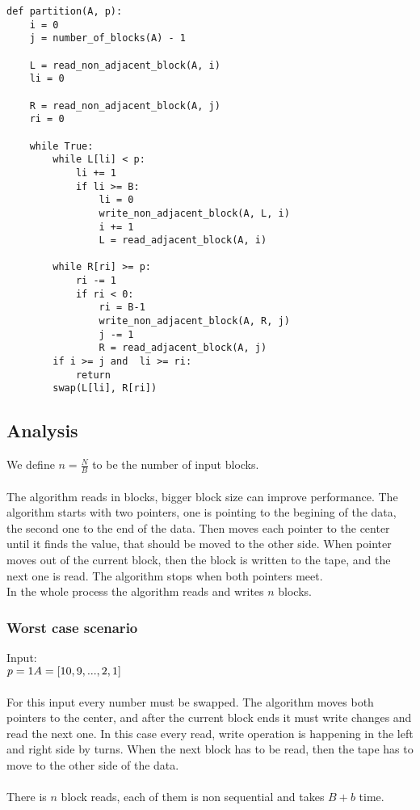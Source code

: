 \documentclass{article}
\begin{document}
\begin{verbatim}
def partition(A, p):
    i = 0
    j = number_of_blocks(A) - 1

    L = read_non_adjacent_block(A, i)
    li = 0

    R = read_non_adjacent_block(A, j)
    ri = 0

    while True:
        while L[li] < p:
            li += 1
            if li >= B:
                li = 0
                write_non_adjacent_block(A, L, i)
                i += 1
                L = read_adjacent_block(A, i)

        while R[ri] >= p:
            ri -= 1
            if ri < 0:
                ri = B-1
                write_non_adjacent_block(A, R, j)
                j -= 1
                R = read_adjacent_block(A, j)
        if i >= j and  li >= ri:
            return
        swap(L[li], R[ri])
\end{verbatim}

\subsection*{Analysis}
We define $n = \frac{N}{B}$ to be the number of input blocks. \\\\
The algorithm reads in blocks, bigger block size can improve performance.
The algorithm starts with two pointers, one is pointing to the begining of the data, the second one to the end of the data.
Then moves each pointer to the center until it finds the value, that should be moved to the other side.
When pointer moves out of the current block, then the block is written to the tape, and the next one is read. The algorithm stops when both pointers meet.\\
In the whole process the algorithm reads and writes $n$ blocks. 

\subsubsection*{Worst case scenario}
Input: \\
$p = 1\\
A = [10, 9, ..., 2, 1]$\\\\
For this input every number must be swapped. The algorithm moves both pointers to the center, and after the current block ends it must write changes and read the next one. In this case every read, write operation is happening in the left and right side by turns. When the next block has to be read, then the tape has to move to the other side of the data. \\ \\
There is $n$ block reads, each of them is non sequential and takes $B+b$ time. \\
\end{document}
